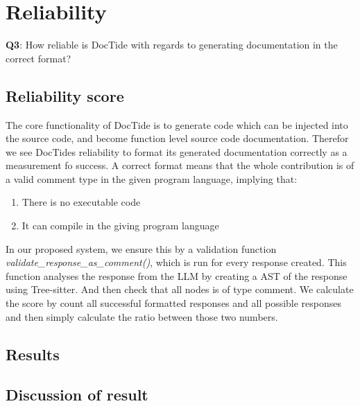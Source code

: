 \section{Reliability}
\textbf{Q3}: How reliable is DocTide with regards to generating documentation in the correct format?
\subsection{Reliability score}
The core functionality of DocTide is to generate code which can be injected into the source code, and become function level source code documentation. Therefor we see DocTides reliability to format its generated documentation correctly as a measurement fo success. A correct format means that the whole contribution is of a valid comment type in the given program language, implying that:
\begin{enumerate}
    \item There is no executable code
    \item It can compile in the giving program language
\end{enumerate}
In our proposed system, we ensure this by a validation function \textit{validate\_response\_as\_comment()}, which is run for every response created. This function analyses the response from the LLM by creating a AST of the response using Tree-sitter. And then check that all nodes is of type comment.
We calculate the score by count all successful formatted responses and all possible responses and then simply calculate the ratio between those two numbers.
\subsection{Results}
\subsection{Discussion of result}